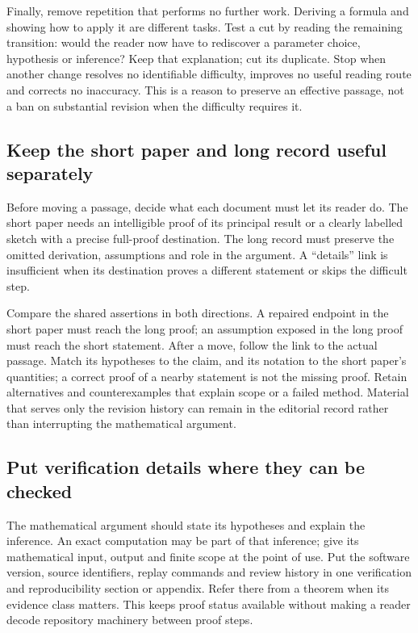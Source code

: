Finally, remove repetition that performs no further work. Deriving a formula
and showing how to apply it are different tasks. Test a cut by reading the
remaining transition: would the reader now have to rediscover a parameter
choice, hypothesis or inference? Keep that explanation; cut its duplicate. Stop when another change resolves no identifiable
difficulty, improves no useful reading route and corrects no inaccuracy.
This is a reason to preserve an effective passage, not a ban on substantial
revision when the difficulty requires it.

\subsection{Keep the short paper and long record useful separately}\label{sec:short-long}

Before moving a passage, decide what each document must let its reader do.
The short paper needs an intelligible proof of its principal result or a clearly
labelled sketch with a precise full-proof destination. The long record must
preserve the omitted derivation, assumptions and role in the argument. A
``details'' link is insufficient when its destination proves a different
statement or skips the difficult step.

Compare the shared assertions in both directions. A repaired endpoint in the
short paper must reach the long proof; an assumption exposed in the long proof
must reach the short statement. After a move, follow the link to the actual
passage. Match its hypotheses to the claim, and its notation to the short
paper's quantities; a correct proof of a nearby statement is not the missing
proof. Retain alternatives and counterexamples that explain scope or a failed
method. Material that serves only the revision history can remain in the
editorial record rather than interrupting the mathematical argument.

\subsection{Put verification details where they can be checked}

The mathematical argument should state its hypotheses and explain the
inference. An exact computation may be part of that inference; give its
mathematical input, output and finite scope at the point of use. Put the
software version, source identifiers, replay commands and review history in
one verification and reproducibility section or appendix. Refer there from
a theorem when its evidence class matters. This keeps proof status available
without making a reader decode repository machinery between proof steps.

